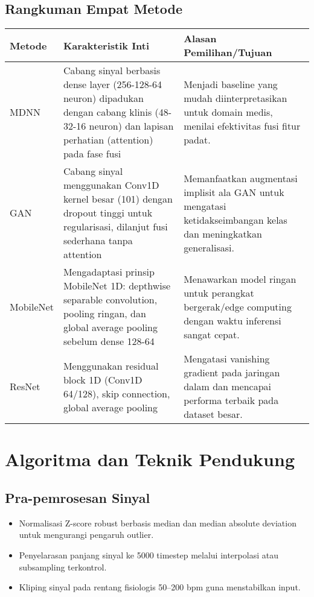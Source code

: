 \documentclass[11pt,a4paper]{article}
\begin{document}
\subsection{Rangkuman Empat Metode}
\begin{table}[h]
\centering
\begin{tabular}{@{}p{2.3cm}p{5.2cm}p{6.5cm}@{}}
\toprule
\textbf{Metode} & \textbf{Karakteristik Inti} & \textbf{Alasan Pemilihan/Tujuan}\\
\midrule
MDNN & Cabang sinyal berbasis dense layer (256-128-64 neuron) dipadukan dengan cabang klinis (48-32-16 neuron) dan lapisan perhatian (attention) pada fase fusi & Menjadi baseline yang mudah diinterpretasikan untuk domain medis, menilai efektivitas fusi fitur padat.\\
GAN & Cabang sinyal menggunakan Conv1D kernel besar (101) dengan dropout tinggi untuk regularisasi, dilanjut fusi sederhana tanpa attention & Memanfaatkan augmentasi implisit ala GAN untuk mengatasi ketidakseimbangan kelas dan meningkatkan generalisasi.\\
MobileNet & Mengadaptasi prinsip MobileNet 1D: depthwise separable convolution, pooling ringan, dan global average pooling sebelum dense 128-64 & Menawarkan model ringan untuk perangkat bergerak/edge computing dengan waktu inferensi sangat cepat.\\
ResNet & Menggunakan residual block 1D (Conv1D 64/128), skip connection, global average pooling & Mengatasi vanishing gradient pada jaringan dalam dan mencapai performa terbaik pada dataset besar.\\
\bottomrule
\end{tabular}
\end{table}

\section{Algoritma dan Teknik Pendukung}
\subsection{Pra-pemrosesan Sinyal}
\begin{itemize}[leftmargin=*]
    \item Normalisasi Z-score robust berbasis median dan median absolute deviation untuk mengurangi pengaruh outlier.
    \item Penyelarasan panjang sinyal ke 5000 timestep melalui interpolasi atau subsampling terkontrol.
    \item Kliping sinyal pada rentang fisiologis 50--200 bpm guna menstabilkan input.
\end{itemize}
\end{document}
